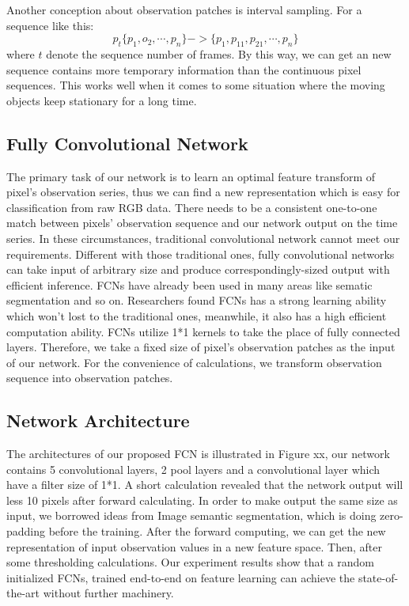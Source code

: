 \documentclass[journal]{IEEEtran}
\begin{document}
Another conception about observation patches is interval sampling.
For a sequence like this: 
\begin{equation}
    p_t\{p_1,o_2,\cdots,p_n\} -> \{p_1,p_{11},p_{21}, \cdots, p_n\}
\end{equation}
where $t$
denote the sequence number of frames.
By this way, we can get an new sequence contains more temporary information  than the continuous pixel sequences.
This works well when it comes to some situation where the moving objects keep stationary for a long time.


 
\subsection{Fully Convolutional Network}
\label{sec3_bc}
The primary task of our network is to learn an optimal feature transform of pixel’s observation series, thus we can find a new representation which is easy for classification from raw RGB data. There needs to be a consistent one-to-one match between pixels’ observation sequence and our network output on the time series. In these circumstances, traditional convolutional network cannot meet our requirements. 
Different with those traditional ones, fully convolutional networks can take input of arbitrary size and produce correspondingly-sized output with efficient inference. FCNs have already been used in many areas like sematic segmentation and so on. Researchers found FCNs has a strong learning ability which won’t lost to the traditional ones, meanwhile, it also has a high efficient computation ability.   
FCNs utilize 1*1 kernels to take the place of fully connected layers.
Therefore, we take a fixed size of pixel’s observation patches as the input of our network. For the convenience of calculations, we transform observation sequence into observation patches.

\subsection{Network Architecture}
The architectures of our proposed FCN is illustrated in Figure xx, our network contains 5 convolutional layers, 2 pool layers and a convolutional layer which have a filter size of 1*1.
A short calculation revealed that the network output will less 10 pixels after forward calculating.
In order to make output the same size as input, we borrowed ideas from Image semantic segmentation, which is doing zero-padding before the training.
After the forward computing, we can get the new representation of input observation values in a new feature space.
Then, after some thresholding calculations.
Our experiment results show that a random initialized FCNs, trained end-to-end on feature learning can achieve the state-of-the-art without further machinery.
\end{document}
